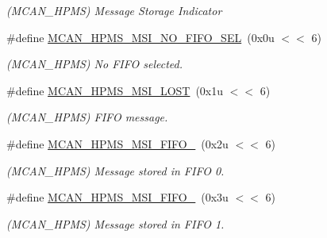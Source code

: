 \begin{DoxyCompactItemize}
\begin{DoxyCompactList}\small\item\em (M\+C\+A\+N\+\_\+\+H\+P\+MS) Message Storage Indicator \end{DoxyCompactList}\item 
\mbox{\label{group__SAMV71__MCAN_ga1417d340916704086d1692f4f774aa64}} 
\#define \mbox{\hyperlink{group__SAMV71__MCAN_ga1417d340916704086d1692f4f774aa64}{M\+C\+A\+N\+\_\+\+H\+P\+M\+S\+\_\+\+M\+S\+I\+\_\+\+N\+O\+\_\+\+F\+I\+F\+O\+\_\+\+S\+EL}}~(0x0u $<$$<$ 6)
\begin{DoxyCompactList}\small\item\em (M\+C\+A\+N\+\_\+\+H\+P\+MS) No F\+I\+FO selected. \end{DoxyCompactList}\item 
\mbox{\label{group__SAMV71__MCAN_ga5d4ad2d92dc983956caff684d6b8c785}} 
\#define \mbox{\hyperlink{group__SAMV71__MCAN_ga5d4ad2d92dc983956caff684d6b8c785}{M\+C\+A\+N\+\_\+\+H\+P\+M\+S\+\_\+\+M\+S\+I\+\_\+\+L\+O\+ST}}~(0x1u $<$$<$ 6)
\begin{DoxyCompactList}\small\item\em (M\+C\+A\+N\+\_\+\+H\+P\+MS) F\+I\+FO message. \end{DoxyCompactList}\item 
\mbox{\label{group__SAMV71__MCAN_gabd49338c1a366c1e6387e37d942dd817}} 
\#define \mbox{\hyperlink{group__SAMV71__MCAN_gabd49338c1a366c1e6387e37d942dd817}{M\+C\+A\+N\+\_\+\+H\+P\+M\+S\+\_\+\+M\+S\+I\+\_\+\+F\+I\+F\+O\+\_}}~(0x2u $<$$<$ 6)
\begin{DoxyCompactList}\small\item\em (M\+C\+A\+N\+\_\+\+H\+P\+MS) Message stored in F\+I\+FO 0. \end{DoxyCompactList}\item 
\mbox{\label{group__SAMV71__MCAN_ga6f2b9b6c063a293b676d23ae4a4f2ecc}} 
\#define \mbox{\hyperlink{group__SAMV71__MCAN_ga6f2b9b6c063a293b676d23ae4a4f2ecc}{M\+C\+A\+N\+\_\+\+H\+P\+M\+S\+\_\+\+M\+S\+I\+\_\+\+F\+I\+F\+O\+\_}}~(0x3u $<$$<$ 6)
\begin{DoxyCompactList}\small\item\em (M\+C\+A\+N\+\_\+\+H\+P\+MS) Message stored in F\+I\+FO 1. \end{DoxyCompactList}\item 

\end{DoxyCompactItemize}
